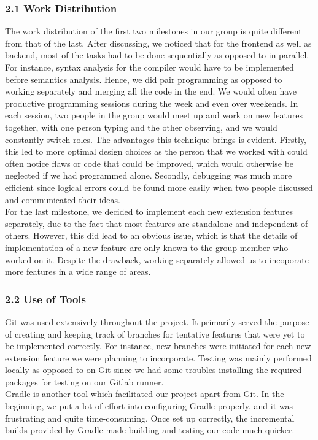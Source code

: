 \documentclass[10pt,a4paper]{report}
\begin{document}
  \subsubsection*{2.1 Work Distribution}
  The work distribution of the first two milestones in our group is quite different 
  from that of the last. After discussing, we noticed that for the frontend as well
  as backend, most of the tasks had to be done sequentially as opposed to in parallel. 
  For instance, syntax analysis for the compiler would have to be implemented before 
  semantics analysis. Hence, we did pair programming as opposed to working separately 
  and merging all the code in the end. We would often have productive programming 
  sessions during the week and even over weekends. In each session, two people in the 
  group would meet up and work on new features together, with one person typing and the 
  other observing, and we would constantly switch roles. The advantages this technique 
  brings is evident. Firstly, this led to more optimal design choices as the person 
  that we worked with could often notice flaws or code that could be improved, which 
  would otherwise be neglected if we had programmed alone. Secondly, debugging was much 
  more efficient since logical errors could be found more easily when two people 
  discussed and communicated their ideas.\\
  For the last milestone, we decided to implement each new extension features separately, 
  due to the fact that most features are standalone and independent of others. However, 
  this did lead to an obvious issue, which is that the details of implementation of a new 
  feature are only known to the group member who worked on it. Despite the drawback, 
  working separately allowed us to incoporate more features in a wide range of areas.

  \subsubsection*{2.2 Use of Tools}
  Git was used extensively throughout the project. It primarily served the purpose 
  of creating and keeping track of branches for tentative features that were yet to 
  be implemented correctly. For instance, new branches were initiated for each new 
  extension feature we were planning to incorporate. Testing was mainly performed 
  locally as opposed to on Git since we had some troubles installing the required 
  packages for testing on our Gitlab runner.\\
  Gradle is another tool which facilitated our project apart from Git. In the beginning,
  we put a lot of effort into configuring Gradle properly, and it was frustrating and 
  quite time-consuming. Once set up correctly, the incremental builds provided by Gradle 
  made building and testing our code much quicker.
\end{document}
